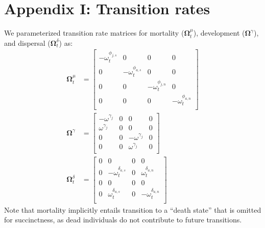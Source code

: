 \section*{Appendix I: Transition rates} 

We parameterized transition rate matrices for mortality ($\boldsymbol\Omega^{\mu}_t$), 
development ($\boldsymbol\Omega^{\gamma}$), 
and dispersal ($\boldsymbol\Omega^{\delta}_t$) as:
\begin{equation} \label{eq:Theta}
\begin{aligned}
\boldsymbol\Omega^{\mu}_t & = 
\left[
\begin{array}{cc|cc}
    -\omega^{\phi_{j,s}}_t & 0 & 0 & 0 \\
    0 & -\omega^{\phi_{a,s}}_t & 0 & 0 \\
    \hline
    0 & 0 & -\omega^{\phi_{j,n}}_t & 0 \\
    0 & 0 & 0 & -\omega^{\phi_{a,n}}_t \\
    \end{array}
\right] \\
\boldsymbol\Omega^{\gamma} & = 
\left[
\begin{array}{cc|cc}
    -\omega^{\gamma_{j}} & 0 & 0 & 0 \\
    \omega^{\gamma_{j}}  & 0 & 0 & 0 \\
    \hline
    0 & 0 & -\omega^{\gamma_{j}} & 0 \\
    0 & 0 & \omega^{\gamma_{j}}  & 0 \\
    \end{array}
\right] \\
\boldsymbol\Omega^{\delta}_t & = 
\left[
\begin{array}{cc|cc}
    0 & 0 & 0 & 0 \\
    0 & -\omega^{\delta_{a,s}}_t & 0 & \omega^{\delta_{a,n}}_t \\
    \hline
    0 & 0 & 0 & 0 \\
    0 & \omega^{\delta_{a,s}}_t & 0 & -\omega^{\delta_{a,n}}_t \\
    \end{array}
\right]
\end{aligned}
\end{equation}
%
Note that mortality implicitly entails transition to a ``death state'' that is omitted 
for succinctness, as dead individuals do not contribute to future transitions.
